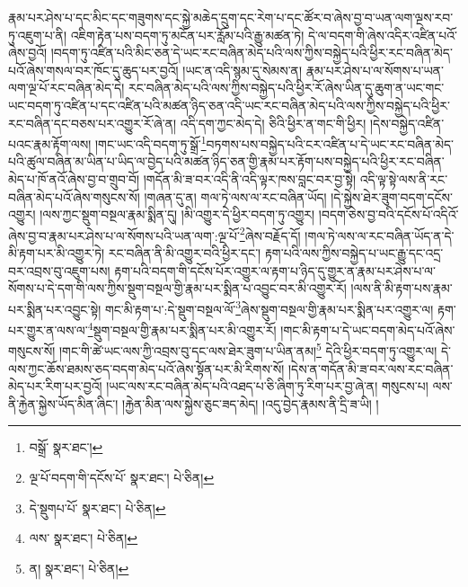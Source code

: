 རྣམ་པར་ཤེས་པ་དང་མིང་དང་གཟུགས་དང་སྐྱེ་མཆེད་དྲུག་དང་རེག་པ་དང་ཚོར་བ་ཞེས་བྱ་བ་ཡན་ལག་ལྔས་རབ་ཏུ་འཇུག་པ་ནི། འཇིག་རྟེན་པས་བདག་ཏུ་མངོན་པར་རློམ་པའི་རྒྱུ་མཚན་ཏེ། དེ་ལ་བདག་གི་ཞེས་འདིར་འཛིན་པའོ་ཞེས་བྱའོ། །བདག་ཏུ་འཛིན་པའི་མིང་ཅན་དེ་ཡང་རང་བཞིན་མེད་པའི་ལས་ཀྱིས་བསྐྱེད་པའི་ཕྱིར་རང་བཞིན་མེད་པའོ་ཞེས་གསལ་བར་ཁོང་དུ་ཆུད་པར་བྱའོ། །ཡང་ན་འདི་སྙམ་དུ་སེམས་ན། རྣམ་པར་ཤེས་པ་ལ་སོགས་པ་ཡན་ལག་ལྔ་པོ་རང་བཞིན་མེད་དེ། རང་བཞིན་མེད་པའི་ལས་ཀྱིས་བསྐྱེད་པའི་ཕྱིར་རོ་ཞེས་ཡིན་དུ་ཆུག་ན་ཡང་གང་ཡང་བདག་ཏུ་འཛིན་པ་དང་འཛིན་པའི་མཚན་ཉིད་ཅན་འདི་ཡང་རང་བཞིན་མེད་པའི་ལས་ཀྱིས་བསྐྱེད་པའི་ཕྱིར་རང་བཞིན་དང་བཅས་པར་འགྱུར་རོ་ཞེ་ན། འདི་དག་ཀྱང་མེད་དེ། ཅིའི་ཕྱིར་ན་གང་གི་ཕྱིར། །དེས་བསྐྱེད་འཛིན་པའང་རྣམ་རྟོག་ལས། །གང་ཡང་འདི་བདག་ཏུ་སྒྲོ་\footnote{བསྒྲོ་  སྣར་ཐང་། }བཏགས་པས་བསྐྱེད་པའི་ངར་འཛིན་པ་དེ་ཡང་རང་བཞིན་མེད་པའི་ཚུལ་བཞིན་མ་ཡིན་པ་ཡིད་ལ་བྱེད་པའི་མཚན་ཉིད་ཅན་གྱི་རྣམ་པར་རྟོག་པས་བསྐྱེད་པའི་ཕྱིར་རང་བཞིན་མེད་པ་ཁོ་ནའོ་ཞེས་བྱ་བ་གྲུབ་བོ། །གདོན་མི་ཟ་བར་འདི་ནི་འདི་ལྟར་ཁས་བླང་བར་བྱ་སྟེ། འདི་ལྟ་སྟེ་ལས་ནི་རང་བཞིན་མེད་པའོ་ཞེས་གསུངས་སོ། །གཞན་དུ་ན། གལ་ཏེ་ལས་ལ་རང་བཞིན་ཡོད། །དེ་སྐྱེས་ཐེར་ཟུག་བདག་དངོས་འགྱུར། །ལས་ཀྱང་སྡུག་བསྔལ་རྣམ་སྨིན་དུ། །མི་འགྱུར་དེ་ཕྱིར་བདག་ཏུ་འགྱུར། །བདག་ཅེས་བྱ་བའི་དངོས་པོ་འདིའོ་ཞེས་བྱ་བ་རྣམ་པར་ཤེས་པ་ལ་སོགས་པའི་ཡན་ལག་:ལྔ་པོ་\footnote{ལྔ་པོ་བདག་གི་དངོས་པོ་  སྣར་ཐང་།  པེ་ཅིན། }ཞེས་བརྗོད་དོ། །གལ་ཏེ་ལས་ལ་རང་བཞིན་ཡོད་ན་དེ་མི་རྟག་པར་མི་འགྱུར་ཏེ། རང་བཞིན་ནི་མི་འགྱུར་བའི་ཕྱིར་དང་། རྟག་པའི་ལས་ཀྱིས་བསྐྱེད་པ་ཡང་རྒྱུ་དང་འདྲ་བར་འབྲས་བུ་འཇུག་པས། རྟག་པའི་བདག་གི་དངོས་པོར་འགྱུར་ལ་རྟག་པ་ཉིད་དུ་གྱུར་ན་རྣམ་པར་ཤེས་པ་ལ་སོགས་པ་དེ་དག་གི་ལས་ཀྱིས་སྡུག་བསྔལ་གྱི་རྣམ་པར་སྨིན་པ་འབྱུང་བར་མི་འགྱུར་རོ། །ལས་ནི་མི་རྟག་པས་རྣམ་པར་སྨིན་པར་འབྱུང་སྟེ། གང་མི་རྟག་པ་:དེ་སྡུག་བསྔལ་ལོ་\footnote{དེ་སྡུགཔ་པོ་  སྣར་ཐང་།  པེ་ཅིན། }ཞེས་སྡུག་བསྔལ་གྱི་རྣམ་པར་སྨིན་པར་འགྱུར་ལ། རྟག་པར་གྱུར་ན་ལས་ལ་\footnote{ལས་  སྣར་ཐང་།  པེ་ཅིན། }སྡུག་བསྔལ་གྱི་རྣམ་པར་སྨིན་པར་མི་འགྱུར་རོ། །གང་མི་རྟག་པ་དེ་ཡང་བདག་མེད་པའོ་ཞེས་གསུངས་སོ། །གང་གི་ཚེ་ཡང་ལས་ཀྱི་འབྲས་བུ་དང་ལས་ཐེར་ཟུག་པ་ཡིན་ནམ།\footnote{ན།  སྣར་ཐང་།  པེ་ཅིན། } དེའི་ཕྱིར་བདག་ཏུ་འགྱུར་ལ། དེ་ལས་ཀྱང་ཆོས་ཐམས་ཅད་བདག་མེད་པའོ་ཞེས་སྟོན་པར་མི་རིགས་སོ། །དེས་ན་གདོན་མི་ཟ་བར་ལས་རང་བཞིན་མེད་པར་རིག་པར་བྱའོ། །ཡང་ལས་རང་བཞིན་མེད་པའི་འཐད་པ་ཅི་ཞིག་ཏུ་རིག་པར་བྱ་ཞེ་ན། གསུངས་པ། ལས་ནི་རྐྱེན་སྐྱེས་ཡོད་མིན་ཞིང་། །རྐྱེན་མིན་ལས་སྐྱེས་ཅུང་ཟད་མེད། །འདུ་བྱེད་རྣམས་ནི་དྲི་ཟ་ཡི། །
